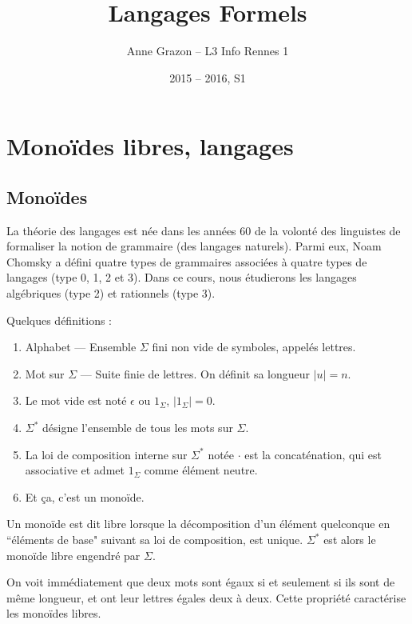 \documentclass[a4paper]{article}
\title{Langages Formels}
\author{Anne Grazon -- L3 Info Rennes 1}
\date{2015 -- 2016, S1}
\begin{document}
\maketitle

\section{Monoïdes libres, langages}

\subsection{Monoïdes}

La théorie des langages est née dans les années 60 de la volonté des linguistes de formaliser la notion de grammaire (des langages naturels). Parmi eux, Noam Chomsky a défini quatre types de grammaires associées à quatre types de langages (type 0, 1, 2 et 3). Dans ce cours, nous étudierons les langages algébriques (type 2) et rationnels (type 3).

\begin{defi}Quelques définitions :
\begin{enumerate}
	\item Alphabet --- Ensemble $\Sigma$ fini non vide de symboles, appelés lettres.
	\item Mot sur $\Sigma$ --- Suite finie de lettres. On définit sa longueur $|u| = n$.
	\item Le mot vide est noté $\epsilon$ ou $1_\Sigma$, $|1_\Sigma| = 0$.
	\item $\Sigma^*$ désigne l'ensemble de tous les mots sur $\Sigma$.
	\item La loi de composition interne sur $\Sigma^*$ notée $\cdot$ est la concaténation, qui est associative et admet $1_\Sigma$ comme élément neutre.
	\item Et ça, c'est un monoïde.
\end{enumerate}
\end{defi}

\begin{defi}
Un monoïde est dit libre lorsque la décomposition d'un élément quelconque en ``éléments de base" suivant sa loi de composition, est unique. $\Sigma^*$ est alors le monoïde libre engendré par $\Sigma$.
\end{defi}

\begin{rem}
On voit immédiatement que deux mots sont égaux si et seulement si ils sont de même longueur, et ont leur lettres égales deux à deux. Cette propriété caractérise les monoïdes libres.
\end{rem}
\end{document}
